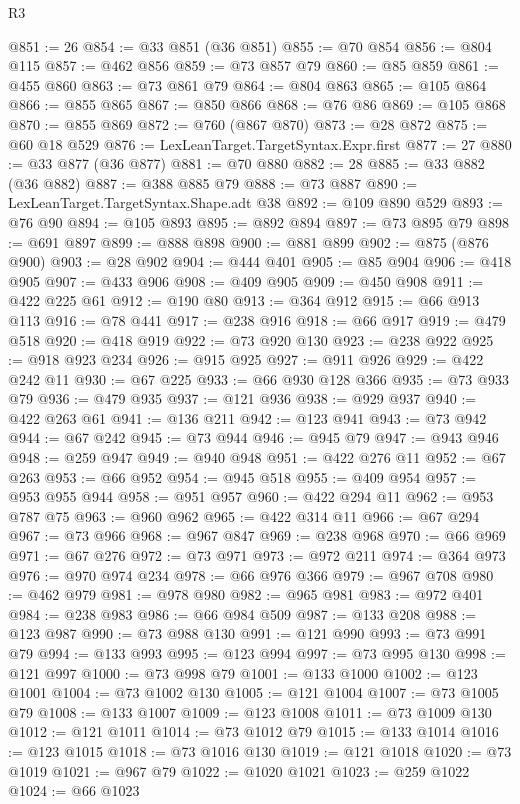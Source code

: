 \begin{lexlean}{R3}
\begin{coremodule}
@851 := 26
@854 := @33 @851 (@36 @851)
@855 := @70 @854
@856 := @804 @115
@857 := @462 @856
@859 := @73 @857 @79
@860 := @85 @859
@861 := @455 @860
@863 := @73 @861 @79
@864 := @804 @863
@865 := @105 @864
@866 := @855 @865
@867 := @850 @866
@868 := @76 @86
@869 := @105 @868
@870 := @855 @869
@872 := @760 (@867 @870)
@873 := @28 @872
@875 := @60 @18 @529
@876 := LexLeanTarget.TargetSyntax.Expr.first
@877 := 27
@880 := @33 @877 (@36 @877)
@881 := @70 @880
@882 := 28
@885 := @33 @882 (@36 @882)
@887 := @388 @885 @79
@888 := @73 @887
@890 := LexLeanTarget.TargetSyntax.Shape.adt @38
@892 := @109 @890 @529
@893 := @76 @90
@894 := @105 @893
@895 := @892 @894
@897 := @73 @895 @79
@898 := @691 @897
@899 := @888 @898
@900 := @881 @899
@902 := @875 (@876 @900)
@903 := @28 @902
@904 := @444 @401
@905 := @85 @904
@906 := @418 @905
@907 := @433 @906
@908 := @409 @905
@909 := @450 @908
@911 := @422 @225 @61
@912 := @190 @80
@913 := @364 @912
@915 := @66 @913 @113
@916 := @78 @441
@917 := @238 @916
@918 := @66 @917
@919 := @479 @518
@920 := @418 @919
@922 := @73 @920 @130
@923 := @238 @922
@925 := @918 @923 @234
@926 := @915 @925
@927 := @911 @926
@929 := @422 @242 @11
@930 := @67 @225
@933 := @66 @930 @128 @366
@935 := @73 @933 @79
@936 := @479 @935
@937 := @121 @936
@938 := @929 @937
@940 := @422 @263 @61
@941 := @136 @211
@942 := @123 @941
@943 := @73 @942
@944 := @67 @242
@945 := @73 @944
@946 := @945 @79
@947 := @943 @946
@948 := @259 @947
@949 := @940 @948
@951 := @422 @276 @11
@952 := @67 @263
@953 := @66 @952
@954 := @945 @518
@955 := @409 @954
@957 := @953 @955 @944
@958 := @951 @957
@960 := @422 @294 @11
@962 := @953 @787 @75
@963 := @960 @962
@965 := @422 @314 @11
@966 := @67 @294
@967 := @73 @966
@968 := @967 @847
@969 := @238 @968
@970 := @66 @969
@971 := @67 @276
@972 := @73 @971
@973 := @972 @211
@974 := @364 @973
@976 := @970 @974 @234
@978 := @66 @976 @366
@979 := @967 @708
@980 := @462 @979
@981 := @978 @980
@982 := @965 @981
@983 := @972 @401
@984 := @238 @983
@986 := @66 @984 @509
@987 := @133 @208
@988 := @123 @987
@990 := @73 @988 @130
@991 := @121 @990
@993 := @73 @991 @79
@994 := @133 @993
@995 := @123 @994
@997 := @73 @995 @130
@998 := @121 @997
@1000 := @73 @998 @79
@1001 := @133 @1000
@1002 := @123 @1001
@1004 := @73 @1002 @130
@1005 := @121 @1004
@1007 := @73 @1005 @79
@1008 := @133 @1007
@1009 := @123 @1008
@1011 := @73 @1009 @130
@1012 := @121 @1011
@1014 := @73 @1012 @79
@1015 := @133 @1014
@1016 := @123 @1015
@1018 := @73 @1016 @130
@1019 := @121 @1018
@1020 := @73 @1019
@1021 := @967 @79
@1022 := @1020 @1021
@1023 := @259 @1022
@1024 := @66 @1023

\end{coremodule}
\end{lexlean}
